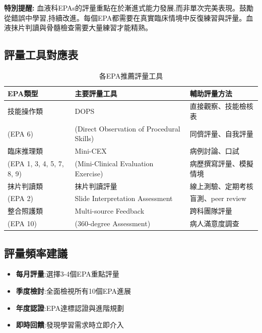 \documentclass[12pt,a4paper]{article}
\begin{document}
\begin{importantbox}
\textbf{特別提醒:} 血液科EPAs的評量重點在於漸進式能力發展,而非單次完美表現。鼓勵從錯誤中學習,持續改進。每個EPA都需要在真實臨床情境中反復練習與評量。血液抹片判讀與骨髓檢查需要大量練習才能精熟。
\end{importantbox}

\subsection{評量工具對應表}
\begin{table}[h]
    \centering
    \caption{各EPA推薦評量工具}
    \begin{tabular}{p{4.5cm} p{4cm} p{5.5cm}}
        \toprule
        \textbf{EPA類型} & \textbf{主要評量工具} & \textbf{輔助評量方法} \\
        \midrule
        技能操作類 & DOPS & 直接觀察、技能檢核表 \\
        (EPA 6) & (Direct Observation of Procedural Skills) & 同儕評量、自我評量 \\
        \midrule
        臨床推理類 & Mini-CEX & 病例討論、口試 \\
        (EPA 1, 3, 4, 5, 7, 8, 9) & (Mini-Clinical Evaluation Exercise) & 病歷撰寫評量、模擬情境 \\
        \midrule
        抹片判讀類 & 抹片判讀評量 & 線上測驗、定期考核 \\
        (EPA 2) & Slide Interpretation Assessment & 盲測、peer review \\
        \midrule
        整合照護類 & Multi-source Feedback & 跨科團隊評量 \\
        (EPA 10) & (360-degree Assessment) & 病人滿意度調查 \\
        \bottomrule
    \end{tabular}
\end{table}

\subsection{評量頻率建議}
\begin{itemize}[nosep]
    \item \textbf{每月評量}:選擇3-4個EPA重點評量
    \item \textbf{季度檢討}:全面檢視所有10個EPA進展
    \item \textbf{年度認證}:EPA達標認證與進階規劃
    \item \textbf{即時回饋}:發現學習需求時立即介入
\end{itemize}
\end{document}

